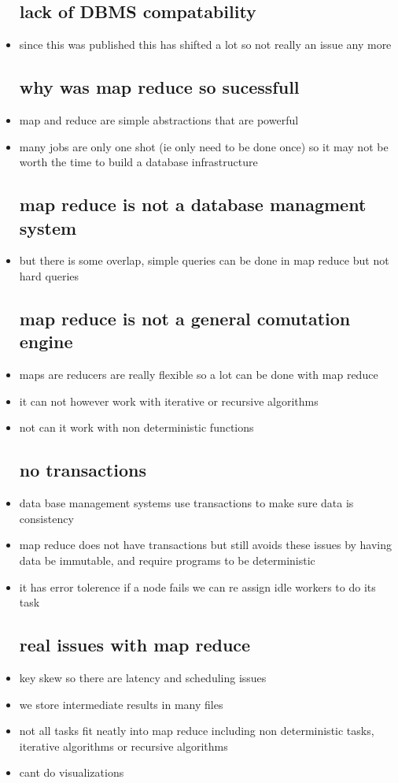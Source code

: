 \documentclass{article}
\begin{document}
\begin{itemize}
\subsection*{lack of DBMS compatability}
\item since this was published this has shifted a lot so not really an issue any more 
\subsection*{why was map reduce so sucessfull}
\item map and reduce are simple abstractions that are powerful  
\item many jobs are only one shot (ie only need to be done once) so it may not be worth the time to build a database infrastructure
\subsection*{map reduce is not a database managment system }
\item but there is some overlap, simple queries can be done in map reduce but not hard queries 
\subsection*{map reduce is not a general comutation engine }
\item maps are reducers are really flexible so a lot can be done with map reduce 
\item it can not however work with iterative or recursive algorithms
\item not can it work with non deterministic functions
\subsection*{no transactions }
\item data base management systems use transactions to make sure data is consistency
\item map reduce does not have transactions but still avoids these issues by having data be immutable, and require programs to be deterministic
\item it has error tolerence if a node fails we can re assign idle workers to do its task 
\subsection*{real issues with map reduce}
\item key skew so there are latency and scheduling issues 
\item we store intermediate results in many files 
\item not all tasks fit neatly into map reduce including non deterministic tasks, iterative algorithms or recursive algorithms
\item cant do visualizations 

\end{itemize}
\end{document}
